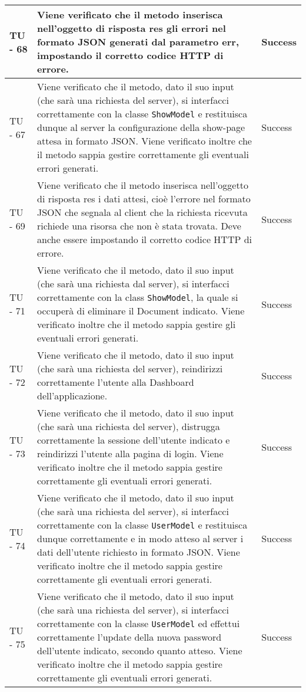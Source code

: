 \begin{center}
\begin{longtable}{ | p{3cm} | p{9cm} | p{2cm} | }
TU - 68 & Viene verificato che il metodo inserisca nell'oggetto di risposta res gli errori nel formato JSON generati dal parametro err, impostando il corretto codice HTTP di errore. & Success \\ \hline
TU - 67 & Viene verificato che il metodo, dato il suo input (che sarà una richiesta del server), si interfacci correttamente con la classe \texttt{ShowModel} e restituisca dunque al server la configurazione della show-page attesa in formato JSON. Viene verificato inoltre che il metodo sappia gestire correttamente gli eventuali errori generati.  & Success \\ \hline
TU - 69 & Viene verificato che il metodo inserisca nell'oggetto di risposta res i dati attesi, cioè l'errore nel formato JSON che segnala al client che la richiesta ricevuta richiede una risorsa che non è stata trovata. Deve anche essere impostando il corretto codice HTTP di errore. & Success \\ \hline
TU - 71 & Viene verificato che il metodo, dato il suo input (che sarà una richiesta dal server), si interfacci correttamente con la class \texttt{ShowModel}, la quale si  occuperà di eliminare il Document indicato. Viene verificato inoltre che il metodo sappia gestire gli eventuali errori generati. & Success \\ \hline
TU - 72 & Viene verificato che il metodo, dato il suo input (che sarà una richiesta del server), reindirizzi correttamente l'utente alla Dashboard dell'applicazione. & Success \\ \hline
TU - 73 & Viene verificato che il metodo, dato il suo input (che sarà una richiesta del server), distrugga correttamente la sessione dell'utente indicato e reindirizzi l'utente alla pagina di login. Viene verificato inoltre che il metodo sappia gestire correttamente gli eventuali errori generati. & Success \\ \hline
TU - 74 & Viene verificato che il metodo, dato il suo input (che sarà una richiesta del server), si interfacci correttamente con la classe \texttt{UserModel} e restituisca dunque correttamente e in modo atteso al server i dati dell'utente richiesto in formato JSON. Viene verificato inoltre che il metodo sappia gestire correttamente gli eventuali errori generati. & Success \\ \hline
TU - 75 & Viene verificato che il metodo, dato il suo input (che sarà una richiesta del server), si interfacci correttamente con la classe \texttt{UserModel} ed effettui correttamente l'update della nuova password dell'utente indicato, secondo quanto atteso. Viene verificato inoltre che il metodo sappia gestire correttamente gli eventuali errori generati. & Success \\ \hline

\end{longtable}
\end{center}
